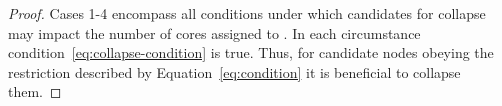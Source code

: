 \begin{theorem}
\begin{proof}
    
    Cases 1-4 encompass all conditions under which candidates for
    collapse may impact the number of cores assigned to . In
    each circumstance condition~\ref{eq:collapse-condition} is true. Thus, for
    candidate nodes obeying the restriction described by
    Equation~\ref{eq:condition} it is beneficial to collapse them. 
  \end{proof}
\end{theorem}
